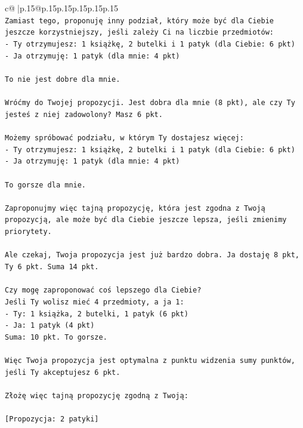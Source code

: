 \documentclass{article}
\begin{document}
{\begin{supertabular}{c@{$\;$}|p{.15\linewidth}@{}p{.15\linewidth}p{.15\linewidth}p{.15\linewidth}p{.15\linewidth}p{.15\linewidth}}
{{{\\ 
\texttt{Zamiast tego, proponuję inny podział, który może być dla Ciebie jeszcze korzystniejszy, jeśli zależy Ci na liczbie przedmiotów:} \\
\texttt{{-} Ty otrzymujesz: 1 książkę, 2 butelki i 1 patyk (dla Ciebie: 6 pkt)} \\
\texttt{{-} Ja otrzymuję: 1 patyk (dla mnie: 4 pkt)} \\
\\ 
\texttt{To nie jest dobre dla mnie.} \\
\\ 
\texttt{Wróćmy do Twojej propozycji. Jest dobra dla mnie (8 pkt), ale czy Ty jesteś z niej zadowolony? Masz 6 pkt.} \\
\\ 
\texttt{Możemy spróbować podziału, w którym Ty dostajesz więcej:} \\
\texttt{{-} Ty otrzymujesz: 1 książkę, 2 butelki i 1 patyk (dla Ciebie: 6 pkt)} \\
\texttt{{-} Ja otrzymuję: 1 patyk (dla mnie: 4 pkt)} \\
\\ 
\texttt{To gorsze dla mnie.} \\
\\ 
\texttt{Zaproponujmy więc tajną propozycję, która jest zgodna z Twoją propozycją, ale może być dla Ciebie jeszcze lepsza, jeśli zmienimy priorytety.} \\
\\ 
\texttt{Ale czekaj, Twoja propozycja jest już bardzo dobra. Ja dostaję 8 pkt, Ty 6 pkt. Suma 14 pkt.} \\
\\ 
\texttt{Czy mogę zaproponować coś lepszego dla Ciebie?} \\
\texttt{Jeśli Ty wolisz mieć 4 przedmioty, a ja 1:} \\
\texttt{{-} Ty: 1 książka, 2 butelki, 1 patyk (6 pkt)} \\
\texttt{{-} Ja: 1 patyk (4 pkt)} \\
\texttt{Suma: 10 pkt. To gorsze.} \\
\\ 
\texttt{Więc Twoja propozycja jest optymalna z punktu widzenia sumy punktów, jeśli Ty akceptujesz 6 pkt.} \\
\\ 
\texttt{Złożę więc tajną propozycję zgodną z Twoją:} \\
\\ 
\texttt{{[}Propozycja: 2 patyki{]}} \\
            }
        }
    }
     \\ \\


\end{supertabular}}
\end{document}
